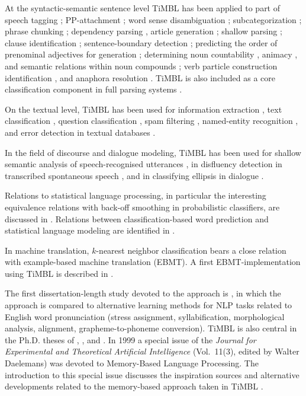 \documentclass{report}
\begin{document}
At the syntactic-semantic sentence level TiMBL has been applied to
part of speech tagging \cite{Daelemans+96b,Zavrel+99,Halteren+01};
PP-attachment \cite{Zavrel+97b}; word sense disambiguation
\cite{Veenstra+00,Stevenson+99,Kokkinakis00,Hoste+02,DeCadt+04};
subcategorization \cite{Buchholz98}; phrase chunking
\cite{Veenstra98,Sang+99}; dependency parsing \cite{Canisius+06b},
article generation \cite{Minnen+00}; shallow parsing
\cite{Daelemans+99a,Buchholz+99,Yeh00}; clause identification
\cite{Orasan00,Sang01}; sentence-boundary detection
\cite{Stevenson+00}; predicting the order of prenominal adjectives for
generation \cite{Malouf00}; determining noun countability
\cite{Baldwin+03}, animacy \cite{Orasan+01}, and semantic relations
within noun compounds \cite{Kim+06b,Nastase+06}; verb particle
construction identification \cite{Kim+06}, and anaphora resolution
\cite{Preiss02,Mitkov+02,Hoste05}. TiMBL is also included as a core
classification component in full parsing systems
\cite{Nivre+04,Sagae+05}.

On the textual level, TiMBL has been used for information extraction
\cite{Zavrel+00b,Zavrel+03,Ahn06}, text classification
\cite{Spitters00}, question classification \cite{Garcia+06,Dridan+07}, spam
filtering \cite{Androutsopoulos+00,}, named-entity recognition
\cite{Buchholz+00,Hendrickx+03,DeMeulder+03,Sporleder+06b,Leveling+06},
and error detection in textual databases \cite{Sporleder+06}.

In the field of discourse and dialogue modeling, TiMBL has been used
for shallow semantic analysis of speech-recognised utterances
\cite{Gustafson+99,Krahmer+01,VandenBosch+01,Lendvai+02a,Lendvai+03},
in disfluency detection in transcribed spontaneous speech
\cite{Lendvai+03c}, and in classifying ellipsis in dialogue
\cite{Fernandez+04}.

Relations to statistical language processing, in particular the
interesting equivalence relations with back-off smoothing in
probabilistic classifiers, are discussed in
\cite{Zavrel+97}. Relations between classification-based word
prediction and statistical language modeling are identified in
\cite{VandenBosch05,VandenBosch06}.

In machine translation, $k$-nearest neighbor classification bears a
close relation with example-based machine translation (EBMT). A first
EBMT-implementation using TiMBL is described in \cite{VandenBosch+07}.

The first dissertation-length study devoted to the
approach is \cite{VandenBosch97}, in which the approach is compared to
alternative learning methods for NLP tasks related to English word
pronunciation (stress assignment, syllabification, morphological
analysis, alignment, grapheme-to-phoneme conversion). TiMBL is also
central in the Ph.D. theses of ,
, and . In 1999 a special
issue of the {\em Journal for Experimental and Theoretical Artificial
  Intelligence} (Vol.~11(3), edited by Walter Daelemans) was devoted
to Memory-Based Language Processing. The introduction to this special
issue discusses the inspiration sources and alternative developments
related to the memory-based approach taken in TiMBL
\cite{Daelemans99b}.
\end{document}
